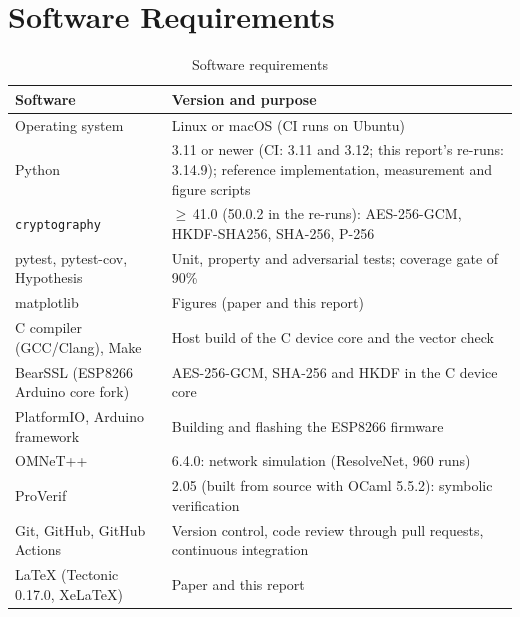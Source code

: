 \section{Software Requirements}
\begin{table}[H]
\centering
\caption{Software requirements}
\label{tab:sw}
\small
\renewcommand{\arraystretch}{1.2}
\begin{tabularx}{\textwidth}{|p{}|X|}
\hline
\textbf{Software} & \textbf{Version and purpose}\\ \hline
Operating system & Linux or macOS (CI runs on Ubuntu)\\ \hline
Python & 3.11 or newer (CI: 3.11 and 3.12; this report's re-runs: 3.14.9); reference implementation, measurement and figure scripts\\ \hline
\texttt{cryptography} & $\geq$\,41.0 (50.0.2 in the re-runs): AES-256-GCM, HKDF-SHA256, SHA-256, P-256\\ \hline
pytest, pytest-cov, Hypothesis & Unit, property and adversarial tests; coverage gate of 90\%\\ \hline
matplotlib & Figures (paper and this report)\\ \hline
C compiler (GCC/Clang), Make & Host build of the C device core and the vector check\\ \hline
BearSSL (ESP8266 Arduino core fork) & AES-256-GCM, SHA-256 and HKDF in the C device core\\ \hline
PlatformIO, Arduino framework & Building and flashing the ESP8266 firmware\\ \hline
OMNeT++ & 6.4.0: network simulation (ResolveNet, 960 runs)\\ \hline
ProVerif & 2.05 (built from source with OCaml 5.5.2): symbolic verification\\ \hline
Git, GitHub, GitHub Actions & Version control, code review through pull requests, continuous integration\\ \hline
\LaTeX{} (Tectonic 0.17.0, XeLaTeX) & Paper and this report\\ \hline
\end{tabularx}
\end{table}


